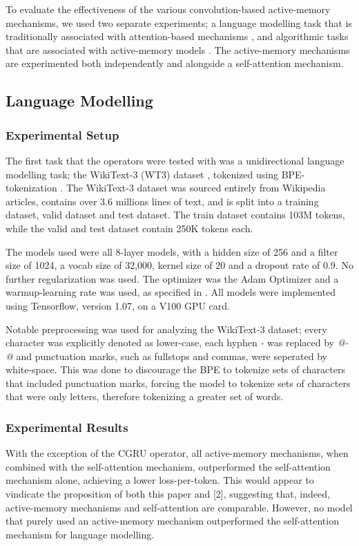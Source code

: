 \documentclass{article}
\begin{document}
To evaluate the effectiveness of the various convolution-based active-memory mechanisms, we used two separate experiments; a language modelling task that is traditionally associated with attention-based mechanisms \cite{shoeybi2019}, and algorithmic tasks that are associated with active-memory models \cite{kaiser2015}. The active-memory mechanisms are experimented both independently and alongside a self-attention mechanism. 

\subsection{Language Modelling}

\subsubsection{Experimental Setup}
The first task that the operators were tested with was a unidirectional language modelling task; the WikiText-3 (WT3) dataset \cite{merity2016}, tokenized using BPE-tokenization \cite{sennrich2016}. The WikiText-3 dataset was sourced entirely from Wikipedia articles, contains over 3.6 millions lines of text, and is split into a training dataset, valid dataset and test dataset. The train dataset contains 103M tokens, while the valid and test dataset contain 250K tokens each.

The models used were all 8-layer models, with a hidden size of 256 and a filter size of 1024, a vocab size of 32,000, kernel size of 20 and a dropout rate of 0.9. No further regularization was used. The optimizer was the Adam Optimizer \cite{kingma2014} and a warmup-learning rate was used, as specified in \cite{vaswani2017}. All models were implemented using Tensorflow, version 1.07, on a V100 GPU card.

Notable preprocessing was used for analyzing the WikiText-3 dataset; every character was explicitly denoted as lower-case, each hyphen \textit{-} was replaced by \textit{ @-@ } and punctuation marks, such as fullstops and commas, were seperated by white-space. This was done to discourage the BPE to tokenize sets of characters that included punctuation marks, forcing the model to tokenize sets of characters that were only letters, therefore tokenizing a greater set of words.

\subsubsection{Experimental Results}
With the exception of the CGRU operator, all active-memory mechanisms, when combined with the self-attention mechanism, outperformed the self-attention mechanism alone, achieving a lower loss-per-token. This would appear to vindicate the proposition of both this paper and [2], suggesting that, indeed, active-memory mechanisms and self-attention are comparable. However, no model that purely used an active-memory mechanism outperformed the self-attention mechanism for language modelling.
\end{document}
